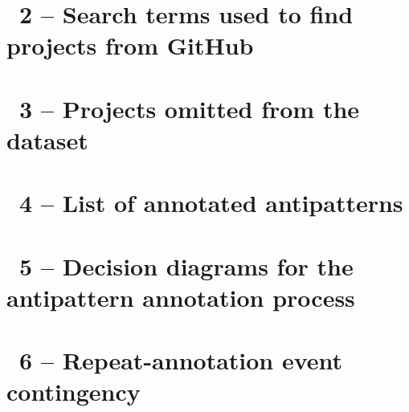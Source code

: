 \clearpage
{}
\makeatletter
\def\@currentlabel{2}
\makeatother
{}\label{chapter:appendix-github-search-terms}
\chapter*{\appendixTitle~2 -- Search terms used to find projects from GitHub}


\clearpage
{}
\makeatletter
\def\@currentlabel{3}
\makeatother
{}\label{chapter:appendix-omitted-projects}
\chapter*{\appendixTitle~3 -- Projects omitted from the dataset}


\clearpage
{}
\makeatletter
\def\@currentlabel{4}
\makeatother
{}\label{chapter:appendix-annotated-antipatterns}
\chapter*{\appendixTitle~4 -- List of annotated antipatterns}


\clearpage
{}
\makeatletter
\def\@currentlabel{5}
\makeatother
{}\label{chapter:appendix-annotation-process-diagrams}
\chapter*{\appendixTitle~5 -- Decision diagrams for the antipattern annotation process}


\clearpage
{}
\makeatletter
\def\@currentlabel{6}
\makeatother
{}\label{chapter:appendix-annotation-confusion-matrix}
\chapter*{\appendixTitle~6 -- Repeat-annotation event contingency}


